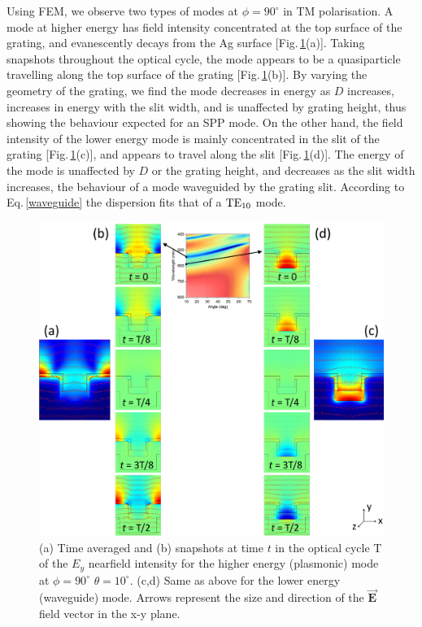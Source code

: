 Using FEM, we observe two types of modes at $\phi=90^{\circ}$ in TM polarisation. A mode at higher energy has field intensity concentrated at the top surface of the grating, and evanescently decays from the Ag surface [Fig.\,\ref{7Fig12}(a)]. Taking snapshots throughout the optical cycle, the mode appears to be a quasiparticle travelling along the top surface of the grating [Fig.\,\ref{7Fig12}(b)]. By varying the geometry of the grating, we find the mode decreases in energy as $D$ increases, increases in energy with the slit width, and is unaffected by grating height, thus showing the behaviour expected for an SPP mode. On the other hand, the field intensity of the lower energy mode is mainly concentrated in the slit of the grating [Fig.\,\ref{7Fig12}(c)], and appears to travel along the slit [Fig.\,\ref{7Fig12}(d)]. The energy of the mode is unaffected by $D$ or the grating height, and decreases as the slit width increases, the behaviour of a mode waveguided by the grating slit. According to Eq.\,\ref{waveguide} the dispersion fits that of a $\textnormal{TE}_{10}$ mode. 
\begin{figure}[h!p] 
\centering    
\includegraphics[width=\textwidth]{Fig12}
\caption{(a) Time averaged and (b) snapshots at time $t$ in the optical cycle T of the $E_y$ nearfield intensity for the higher energy (plasmonic) mode at $\phi=90^{\circ}$ $\theta=10^{\circ}$. (c,d) Same as above for the lower energy (waveguide) mode. Arrows represent the size and direction of the $\vec{\mathbf{E}}$ field vector in the x-y plane. }
\label{7Fig12}
\end{figure}

